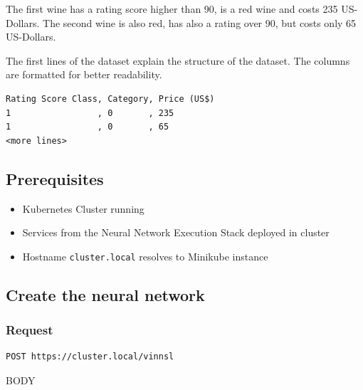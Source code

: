 The first wine has a rating score higher than 90, is a red wine and
costs 235 US-Dollars. The second wine is also red, has also a rating
over 90, but costs only 65 US-Dollars.

The first lines of the dataset explain the structure of the dataset. The
columns are formatted for better readability.

\begin{verbatim}
Rating Score Class, Category, Price (US$)
1                 , 0       , 235
1                 , 0       , 65
<more lines>
\end{verbatim}

\subsection{Prerequisites}\label{prerequisites-3}

\begin{itemize}
\tightlist
\item
  Kubernetes Cluster running
\item
  Services from the Neural Network Execution Stack deployed in cluster
\item
  Hostname \texttt{cluster.local} resolves to Minikube instance
\end{itemize}

\subsection{Create the neural
network}\label{create-the-neural-network-1}

\subsubsection{Request}\label{request-3}

\begin{verbatim}
POST https://cluster.local/vinnsl
\end{verbatim}

BODY

